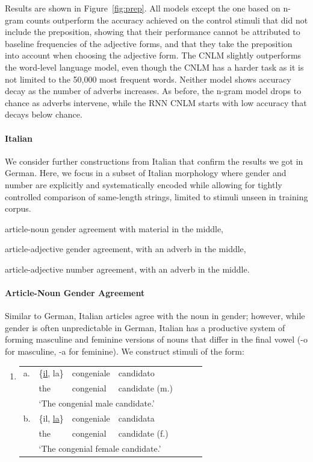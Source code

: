 Results are shown in Figure~\ref{fig:prep}.
All models except the one based on n-gram counts outperform the accuracy achieved on the control stimuli that did not include the preposition, showing that their performance cannot be attributed to baseline frequencies of the adjective forms, and that they take the preposition into account when choosing the adjective form.
The CNLM slightly outperforms the word-level language model, even though the CNLM has a harder task as it is not limited to the 50,000 most frequent words.
Neither model shows accuracy decay as the number of adverbs increases.
As before, the n-gram model drops to chance as adverbs intervene, while the RNN CNLM starts with low accuracy that decays below chance.

\paragraph{Italian} We consider further constructions from Italian that confirm the results we got in German.
Here, we focus in a  subset of Italian morphology where gender and number are explicitly and systematically
encoded while allowing for tightly controlled comparison of
same-length strings, limited to stimuli unseen in training corpus.
\begin{inparaenum}[i)]
\item article-noun gender agreement with material in the middle,
\item article-adjective gender agreement, with an adverb in the middle,
\item article-adjective number agreement, with an adverb in the middle.
\end{inparaenum}

\paragraph{Article-Noun Gender Agreement}

Similar to German, Italian articles agree with the noun in gender; however, while gender is often unpredictable in German, Italian has a productive system of forming masculine and feminine versions of nouns that differ in the final vowel (-o for masculine, -a for feminine).
We construct stimuli of the form:
\begin{enumerate}[label={(\arabic*)}]
	\item 
		\begin{tabular}[t]{lllllll}
	a. & \{\underline{il}, la\} & congeniale & candidato \\
   &  the & congenial & candidate (m.) \\
	& \multicolumn{4}{l}{`The congenial male candidate.'} \\
	b. & \{il, \underline{la}\} & congeniale & candidata \\
    &the & congenial & candidate (f.) \\
	& \multicolumn{4}{l}{`The congenial female candidate.'} \\
\end{tabular}
\end{enumerate}

